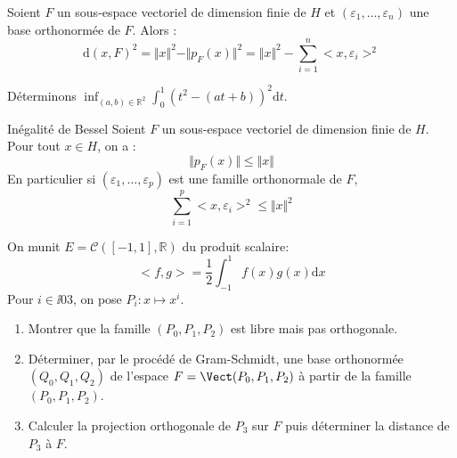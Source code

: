 \documentclass[french,11pt,twoside]{VcCours}
\newcommand{\dt}{\text{d}t}
\newcommand{\dx}{\text{d}x}
\begin{document}
\begin{Proposition}{} Soient $F$ un sous-espace vectoriel de dimension finie de $H$ et $(\varepsilon_1, \ldots, \varepsilon_n)$ une base orthonormée de $F$. Alors :
$$ \textrm{d}(x,F)^2 = \Vert x \Vert^2 - \Vert p_F(x) \Vert^2 = \Vert x \Vert^2 - \sum_{i=1}^n <x,\varepsilon_i>^2 $$
\end{Proposition}

\begin{Demonstration}{}
\vspace{6cm}
\end{Demonstration}


\begin{Exemple}{} Déterminons $\inf_{(a,b) \in \mathbb{R}^2} \int_{0}^1 (t^2-(at+b))^2 \dt$.

\newpage

\vspace*{3cm}
\end{Exemple} 

\begin{Corollaire}{Inégalité de Bessel}
Soient $F$ un sous-espace vectoriel de dimension finie de $H$. Pour tout $x \in H$, on a :
$$ \Vert p_F(x) \Vert \leq \Vert x \Vert$$
En particulier si $(\varepsilon_1, \ldots, \varepsilon_p)$ est une famille orthonormale de $F$,
$$ \sum_{i=1}^p <x,\varepsilon_i>^2 \leq \Vert x \Vert^2 $$
\end{Corollaire}

\begin{Demonstration}{}
\vspace{2cm}
\end{Demonstration}

\begin{ApplicationDirecte}{} 
  On munit $E = \mathcal{C}([ - 1,1],\mathbb{R})$ du produit scalaire:
  \[
  <f,g> = \frac{1}{2}\int_{ - 1}^{1} f(x)g(x) \dx
  \]
Pour $i \in \ii{0}{3}$, on pose $P_{i} : x \mapsto x^{i}$.
  \begin{enumerate}
  \item Montrer que la famille $(P_{0} ,P_{1} ,P_{2})$ est libre mais pas orthogonale.
  \item Déterminer, par le procédé de Gram-Schmidt, une base orthonormée $(Q_{0} ,Q_{1} ,Q_{2})$ de l'espace $F = \Vect(P_{0} ,P_{1} ,P_{2})$ à partir de la famille $(P_{0} ,P_{1} ,P_{2})$.
  \item Calculer la projection orthogonale de $P_{3}$ sur $F$ puis déterminer la distance de $P_{3}$ à $F$.
  \end{enumerate}
\end{ApplicationDirecte}
\end{document}
